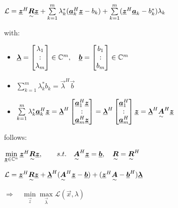 $\mathcal{L}=\vec{z}^H\ma{R}\vec{z} + \sum\limits_{k=1}^m\lambda_k^*(\vec{a}_k^H\vec{z}-b_k)+\sum\limits_{k=1}^m(\vec{z}^H\vec{a}_k-b_k^*)\lambda_k$

with: 
\begin{itemize}
\item $\vec{\lambda}=\begin{bmatrix}\lambda_1\\\svdots\\\lambda_m\end{bmatrix}\in\mathbb{C}^m, \quad \vec{b}
=\begin{bmatrix}b_1\\\svdots\\b_m\end{bmatrix}\in\mathbb{C}^m$
\item $\sum\limits_{k=1}^m\lambda_k^*b_k=\vec{\lambda}^H\vec{b}$
\item $\sum\limits_{k=1}^m\lambda_k^*\vec{a}_k^H\vec{z}
=\vec{\lambda}^H\begin{bmatrix}\vec{a}_1^H  \vec{z}\\\svdots\\ \vec{a}_m^H  \vec{z} \end{bmatrix}
=\vec{\lambda}^H\begin{bmatrix}\vec{a}_1^H\\\svdots\\ \vec{a}_m^H  \end{bmatrix}\vec{z} 
=\vec{\lambda}^H\ma{A}^H\vec{z}$
\end{itemize}

follows:

$\min\limits_{\vec{z}\in\mathbb{C}^n} \vec{z}^H\ma{R}\vec{z}, 
\qquad s.t.\quad 
\ma{A}^H\vec{z}=\vec{b}, \quad \ma{R}=\ma{R}^H$

$\mathcal{L}=\vec{z}^H\ma{R}\vec{z}+\vec{\lambda}^H(\ma{A}^H\vec{z}-\vec{b})+(\vec{z}^H\ma{A}-\vec{b}^H)\vec{\lambda}
$

$\Rightarrow \quad \min\limits_{\vec{z}}\max\limits_{\vec{\lambda}}\mathcal{L}(\vec{x},\lambda)$


